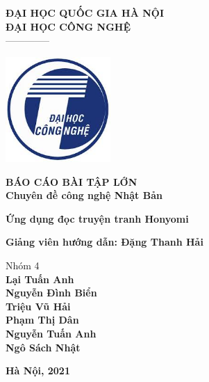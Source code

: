 \documentclass[./main.tex]{subfiles}
\begin{document}
\begin{titlepage}	
	\begin{center}
		\textbf{ĐẠI HỌC QUỐC GIA HÀ NỘI}\\
		\textbf{ĐẠI HỌC CÔNG NGHỆ}\\
		--------------
	
		\vspace*{30pt}
		
		\includegraphics[width=0.3\textwidth]{./images/uet.jpg}
		
		\vspace*{50pt}
		
		\textbf{BÁO CÁO BÀI TẬP LỚN 
			\\ Chuyên đề công nghệ Nhật Bản}
		\vspace*{30pt}
		
		\textbf{Ứng dụng đọc truyện tranh Honyomi\\}

		\vspace*{50pt}
		
		\textbf{Giảng viên hướng dẫn: Đặng Thanh Hải}
		
		\vspace*{30pt}
		
		Nhóm 4 \\
		\textbf{Lại Tuấn Anh\\
				Nguyễn Đình Biển\\
				Triệu Vũ Hải \\
				Phạm Thị Dân \\
				Nguyễn Tuấn Anh\\
				Ngô Sách Nhật \\
		}
		
		\vspace*{40pt}
	\end{center}
	
	
	\begin{center}
		\textbf{Hà Nội, 2021}
	\end{center}
\end{titlepage}
\end{document}
